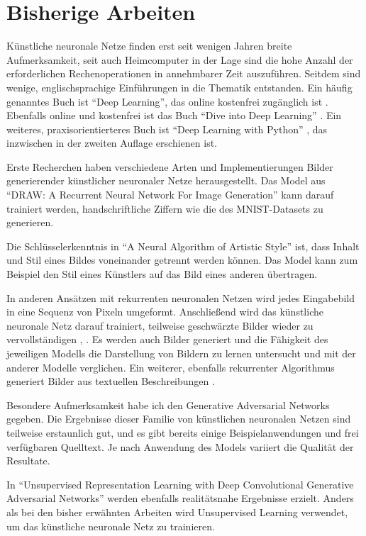 \section{Bisherige Arbeiten}
\label{sec:related}
Künstliche neuronale Netze finden erst seit wenigen Jahren breite Aufmerksamkeit, seit auch Heimcomputer in der Lage sind die hohe Anzahl der erforderlichen Rechenoperationen in annehmbarer Zeit auszuführen. Seitdem sind wenige, englischsprachige Einführungen in die Thematik entstanden. Ein häufig genanntes Buch ist ``Deep Learning'', das online kostenfrei zugänglich ist \cite{goodfellow2016deeplearning}. Ebenfalls online und kostenfrei ist das Buch ``Dive into Deep Learning'' \cite{zhang2020dive}. Ein weiteres, praxisorientierteres Buch ist ``Deep Learning with Python'' \cite{chollet2021deep}, das inzwischen in der zweiten Auflage erschienen ist.

Erste Recherchen haben verschiedene Arten und Implementierungen Bilder generierender künstlicher neuronaler Netze herausgestellt. Das Model aus ``DRAW: A Recurrent Neural Network For Image Generation'' \cite{gregor2015draw} kann darauf trainiert werden, handschriftliche Ziffern wie die des MNIST-Datasets \cite{deng2012mnist} zu generieren.

Die Schlüsselerkenntnis in ``A Neural Algorithm of Artistic Style'' \cite{gatys2015nst} ist, dass Inhalt und Stil eines Bildes voneinander getrennt werden können. Das Model kann zum Beispiel den Stil eines Künstlers auf das Bild eines anderen übertragen.

In anderen Ansätzen mit rekurrenten neuronalen Netzen wird jedes Eingabebild in eine Sequenz von Pixeln umgeformt. Anschließend wird das künstliche neuronale Netz darauf trainiert, teilweise geschwärzte Bilder wieder zu vervollständigen \cite{chen2020generative}, \cite{oord2016pixel}. Es werden auch Bilder generiert und die Fähigkeit des jeweiligen Modells die Darstellung von Bildern zu lernen untersucht und mit der anderer Modelle verglichen. Ein weiterer, ebenfalls rekurrenter Algorithmus generiert Bilder aus textuellen Beschreibungen \cite{ramesh2021zeroshot}.

Besondere Aufmerksamkeit habe ich den Generative Adversarial Networks \cite{goodfellow2014generative} gegeben. Die Ergebnisse dieser Familie von künstlichen neuronalen Netzen sind teilweise erstaunlich gut, und es gibt bereits einige Beispielanwendungen und frei verfügbaren Quelltext. Je nach Anwendung des Models variiert die Qualität der Resultate.

In ``Unsupervised Representation Learning with Deep Convolutional Generative Adversarial Networks'' \cite{radford2016unsupervised} werden ebenfalls
realitätsnahe Ergebnisse erzielt. Anders als bei den bisher erwähnten Arbeiten
wird Unsupervised Learning verwendet, um das künstliche neuronale Netz zu trainieren.

